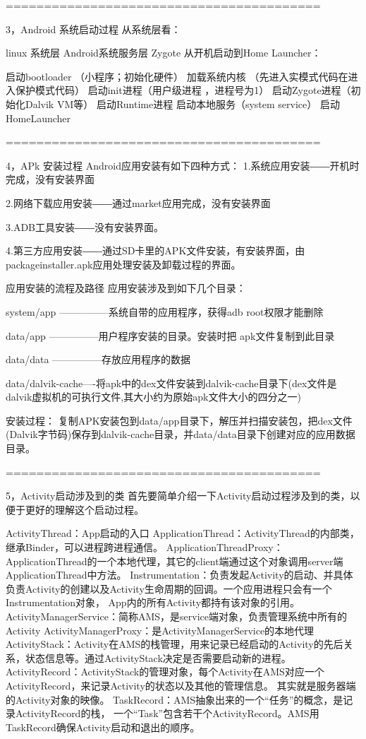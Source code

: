 =========================================

3，Android 系统启动过程
  从系统层看：

  linux 系统层
  Android系统服务层
  Zygote
  从开机启动到Home Launcher：

  启动bootloader （小程序；初始化硬件）
  加载系统内核 （先进入实模式代码在进入保护模式代码）
  启动init进程（用户级进程 ，进程号为1）
  启动Zygote进程（初始化Dalvik VM等）
  启动Runtime进程
  启动本地服务（system service）
  启动 HomeLauncher

=========================================

4，APk 安装过程
  Android应用安装有如下四种方式：
  1.系统应用安装――开机时完成，没有安装界面

  2.网络下载应用安装――通过market应用完成，没有安装界面

  3.ADB工具安装――没有安装界面。

  4.第三方应用安装――通过SD卡里的APK文件安装，有安装界面，由 packageinstaller.apk应用处理安装及卸载过程的界面。

  应用安装的流程及路径
  应用安装涉及到如下几个目录：

  system/app ---------------系统自带的应用程序，获得adb root权限才能删除

  data/app ---------------用户程序安装的目录。安装时把 apk文件复制到此目录

  data/data ---------------存放应用程序的数据

  data/dalvik-cache----将apk中的dex文件安装到dalvik-cache目录下(dex文件是dalvik虚拟机的可执行文件,其大小约为原始apk文件大小的四分之一)

  安装过程：
  复制APK安装包到data/app目录下，解压并扫描安装包，把dex文件(Dalvik字节码)保存到dalvik-cache目录，并data/data目录下创建对应的应用数据目录。

=========================================

5，Activity启动涉及到的类
首先要简单介绍一下Activity启动过程涉及到的类，以便于更好的理解这个启动过程。

ActivityThread：App启动的入口
ApplicationThread：ActivityThread的内部类，继承Binder，可以进程跨进程通信。
ApplicationThreadProxy：ApplicationThread的一个本地代理，其它的client端通过这个对象调用server端ApplicationThread中方法。
Instrumentation：负责发起Activity的启动、并具体负责Activity的创建以及Activity生命周期的回调。一个应用进程只会有一个Instrumentation对象，
                 App内的所有Activity都持有该对象的引用。
ActivityManagerService：简称AMS，是service端对象，负责管理系统中所有的Activity
ActivityManagerProxy：是ActivityManagerService的本地代理
ActivityStack：Activity在AMS的栈管理，用来记录已经启动的Activity的先后关系，状态信息等。通过ActivityStack决定是否需要启动新的进程。
ActivityRecord：ActivityStack的管理对象，每个Activity在AMS对应一个ActivityRecord，来记录Activity的状态以及其他的管理信息。
                其实就是服务器端的Activity对象的映像。
TaskRecord：AMS抽象出来的一个“任务”的概念，是记录ActivityRecord的栈，
            一个“Task”包含若干个ActivityRecord。AMS用TaskRecord确保Activity启动和退出的顺序。


